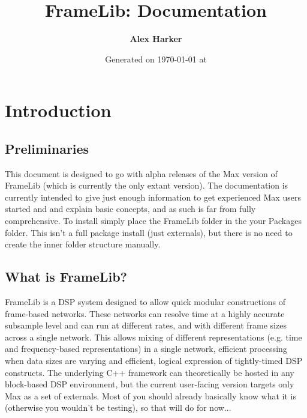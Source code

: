 \documentclass{article}
\title{
\vspace{2in}
\textmd{\textbf{FrameLib: \version{} Documentation}}
\vspace{0.3in}
}
\author{\textbf{Alex Harker}}
\date{Generated on \today{} at \currenttime} %
\begin{document}
\maketitle


\newpage
\tableofcontents
\newpage


\section{Introduction}
\vspace{0.1in}

\subsection{Preliminaries}

This document is designed to go with alpha releases of the Max version of FrameLib (which is currently the only extant version). The documentation is currently intended to give just enough information to get experienced Max users started and and explain basic concepts, and as such is far from fully comprehensive. To install simply place the FrameLib folder in the your Packages folder. This isn't a full package install (just externals), but there is no need to create the inner folder structure manually.

\subsection{What is FrameLib?}

FrameLib is a DSP system designed to allow quick modular constructions of frame-based networks. These networks can resolve time at a highly accurate subsample level and can run at different rates, and with different frame sizes across a single network. This allows mixing of different representations (e.g. time and frequency-based representations) in a single network, efficient processing when data sizes are varying and efficient, logical expression of tightly-timed DSP constructs. The underlying C++ framework can theoretically be hosted in any block-based DSP environment, but the current user-facing version targets only Max as a set of externals. Most of you should already basically know what it is (otherwise you wouldn't be testing), so that will do for now...
\end{document}
